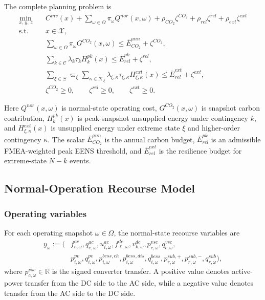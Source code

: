 The complete planning problem is
\begin{align}
\min_{x,\,y,\,z} \quad
& C^{inv}(x)
+ \sum_{\omega\in\Omega} \pi_\omega Q^{nor}(x,\omega)
+ \rho_{CO_2}\zeta^{CO_2}
+ \rho_{rel}\zeta^{rel}
+ \rho_{ext}\zeta^{ext}
\label{eq:10b-master-obj}\\
\text{s.t.}\quad
& x\in\mathcal X,
\label{eq:10b-master-xset}\\
& \sum_{\omega\in\Omega} \pi_\omega G^{CO_2}(x,\omega) \le \overline E^{ann}_{CO_2} + \zeta^{CO_2},
\label{eq:10b-master-carbon}\\
& \sum_{k\in\mathcal{C}} \lambda_k\tau_k H^{pk}_k(x) \le \overline E^{pk}_{rel} + \zeta^{rel},
\label{eq:10b-master-reliability}\\
& \sum_{\xi\in\Xi} \varpi_\xi \sum_{\kappa\in\mathcal{K}_\xi} \lambda_{\xi,\kappa}\tau_{\xi,\kappa} H^{ext}_{\xi,\kappa}(x)
\le \overline E^{ext}_{rel} + \zeta^{ext},
\label{eq:10b-master-extreme}\\
& \zeta^{CO_2} \ge 0,
\qquad
\zeta^{rel} \ge 0,
\qquad
\zeta^{ext} \ge 0.
\label{eq:10b-master-slacks}
\end{align}

Here \(Q^{nor}(x,\omega)\) is normal-state operating cost, \(G^{CO_2}(x,\omega)\) is snapshot carbon contribution, \(H_k^{pk}(x)\) is peak-snapshot unsupplied energy under contingency \(k\), and \(H^{ext}_{\xi,\kappa}(x)\) is unsupplied energy under extreme state \(\xi\) and higher-order contingency \(\kappa\). The scalar \(\overline E^{ann}_{CO_2}\) is the annual carbon budget, \(\overline E^{pk}_{rel}\) is an admissible FMEA-weighted peak EENS threshold, and \(\overline E^{ext}_{rel}\) is the resilience budget for extreme-state \(N{-}k\) events.

\subsection{Normal-Operation Recourse Model}

\subsubsection{Operating variables}

For each operating snapshot \(\omega\in\Omega\), the normal-state recourse variables are
\begin{align}
y_\omega := \Big(
&f_{e,\omega}^{ac},q_{e,\omega}^{ac},u_{i,\omega}^{ac},
f_{\ell,\omega}^{dc},v_{k,\omega}^{dc},
p_{c,\omega}^{vsc},q_{c,\omega}^{vsc}, \\
&p_{i,\omega}^{pv},q_{i,\omega}^{pv},
p_{i,\omega}^{bess,ch},p_{i,\omega}^{bess,dis},q_{i,\omega}^{bess},
p_{r,\omega}^{sub,+},p_{r,\omega}^{sub,-},q_{r,\omega}^{sub}
\Big),
\end{align}
where \(p_{c,\omega}^{vsc}\in\mathbb R\) is the signed converter transfer. A positive value denotes active-power transfer from the DC side to the AC side, while a negative value denotes transfer from the AC side to the DC side.

